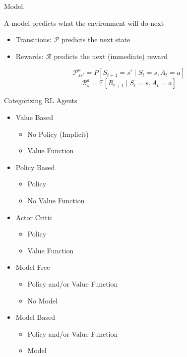\documentclass[english]{article}
\newenvironment{grey}{\color{blue}}{\ignorespacesafterend}
\begin{document}

\item {Model}.

A model predicts what the environment will do next
\begin{itemize}
    \item Transitions: $\mathcal{P}$ predicts the next state
    \item Rewards: $\mathcal{R}$ predicts the next (immediate) reward
\end{itemize}

\[ \mathcal{P}^a_{s s'} = P[S_{t+1} = s' \mid S_t = s, A_t = a] \]
\[ \mathcal{R}^a_{s} = \mathbb{E}[R_{t+1} \mid S_t = s, A_t = a] \]



\item {Categorizing RL Agents}
 
 
\begin{itemize}
    \item Value Based
    \begin{itemize}
        \item \begin{grey} No Policy (Implicit)\end{grey}
        \item Value Function
    \end{itemize}
    \item Policy Based
    \begin{itemize}
        \item Policy
        \item \begin{grey}No Value Function\end{grey}
    \end{itemize}
    \item Actor Critic
    \begin{itemize}
        \item Policy
        \item Value Function
    \end{itemize}
\end{itemize}

 
\begin{itemize}
    \item Model Free
    \begin{itemize}
        \item Policy and/or Value Function
        \item \begin{grey}No Model\end{grey}
    \end{itemize}
    \item Model Based
    \begin{itemize}
        \item Policy and/or Value Function
        \item Model
    \end{itemize}
\end{itemize}
 
\end{document}
